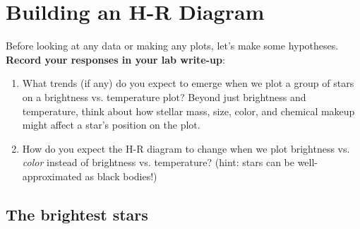 \documentclass[11pt]{article}
\begin{document}
\section{Building an H-R Diagram}
Before looking at any data or making any plots, let's make some hypotheses. \textbf{Record your responses in your lab write-up}:
\begin{enumerate}
    \item What trends (if any) do you expect to emerge when we plot a group of stars on a brightness vs. temperature plot? Beyond just brightness and temperature, think about how stellar mass, size, color, and chemical makeup might affect a star's position on the plot.
    
    \item How do you expect the H-R diagram to change when we plot brightness vs. \emph{color} instead of brightness vs. temperature? (hint: stars can be well-approximated as black bodies!) 
    
\end{enumerate}

\subsection{The brightest stars}
\end{document}
